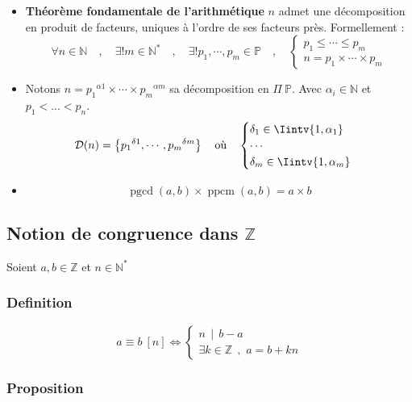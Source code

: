 \documentclass{report}
\newcommand{\N}{\mathbb{N}}
\newcommand{\Z}{\mathbb{Z}}
\newcommand{\ppcm}{\operatorname{ppcm}}
\newcommand{\pgcd}{\operatorname{pgcd}}
\newcommand{\qvq}{\quad , \quad}
\begin{document}
        \begin{itemize}
          \item \textbf{Théorème fondamentale de l'arithmétique}
                $n$ admet une décomposition en produit de facteurs, uniques à l'ordre de ses facteurs près. Formellement : 
                \[\forall n \in \N \qvq \exists! m\in\N^* \qvq \exists! p_1,\cdots,p_m\in\mathbb{P} \qvq \begin{cases}
                  p_1\le\cdots\le p_m\\
                  n = p_1 \times \cdots \times p_m
                \end{cases}\]
          \item Notons $n = {p_1}^{\alpha1}\times\cdots\times {p_m}^{\alpha m}$ sa décomposition en $\Pi~\mathbb{P}$. Avec $\alpha_i \in\N$ et $p_1<...<p_n$.
                \[\mathcal{D}(n) = \left\{ {p_1}^{\delta 1}, \cdots , {p_m}^{\delta m} \right\} \quad \text{où} \quad \begin{cases}
                  \delta_1\in\Iintv{1,\alpha_1}\\
                  \cdots \\
                  \delta_m\in\Iintv{1,\alpha_m}
                \end{cases}\]
          \item \[\pgcd(a,b)\times\ppcm(a,b) = a\times b\]
        \end{itemize}

    \newpage

    \subsection{Notion de congruence dans $\Z$}

      Soient $a,b\in\Z$ et $n\in\N^*$

      \subsubsection{Definition}
          
        \[\boxed{a\equiv b ~[n] \iff \begin{cases}
          n~~|~~b-a\\
          \exists k \in \Z ~~, \, \, a=b +kn
        \end{cases}}\]

      \subsubsection{Proposition}
\end{document}
